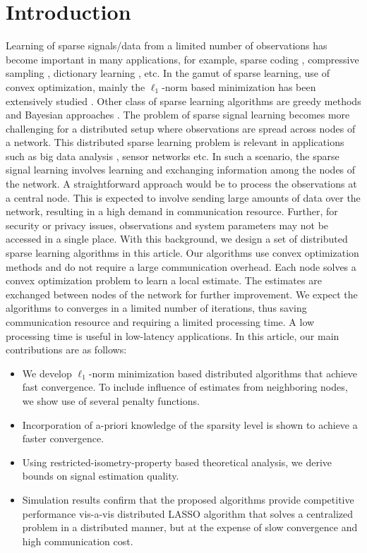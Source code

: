 \documentclass[journal]{IEEEtran}
\begin{document}
\section{Introduction}
Learning of sparse signals/data from a limited number of observations has become important in many applications, for example, sparse coding \cite{Elad_book_2010, Rubinstein_Elad_Dictionary_ProcIEEE_2010}, compressive sampling \cite{Donoho_2006_Compressed_sensing, CS_introduction_Candes_Wakin_2008}, dictionary learning \cite{Kreutz_Delgado_2003, Liang_distributed_DL_in_sensor_networks_2014}, etc. In the gamut of sparse learning, use of convex optimization, mainly the $\ell_1$-norm based minimization has been extensively studied \cite{Candes_Tao_universal_encoding_strategies_2006}. Other class of sparse learning algorithms are greedy methods and Bayesian approaches \cite{Chen_decentralized_bayesian_DCS_TWC_2016}. The problem of sparse signal learning becomes more challenging for a distributed setup where observations are spread across nodes of a network. This distributed sparse learning problem is relevant in applications such as big data analysis \cite{Giannakis_Big_Data_Analytics_SPMagazine_2014}, sensor networks \cite{Varshaney_OMP_joint_sparsity_pattern_recovery_TSP_2014, Varshaney_wireless_CS_distributed_sparse_TSIPN_2015} etc. In such a scenario, the sparse signal learning involves learning and exchanging information among the nodes of the network. A straightforward approach would be to process the observations at a central node. This is expected to involve sending large amounts of data over the network, resulting in a high demand in communication resource. Further, for security or privacy issues, observations and system parameters may not be accessed in a single place. With this background, we design a set of distributed sparse learning algorithms in this article. Our algorithms use convex optimization methods and do not require a large communication overhead. Each node solves a convex optimization problem to learn a local estimate. The estimates are exchanged between nodes of the network for further improvement. We expect the algorithms to converges in a limited number of iterations, thus saving communication resource and requiring a limited processing time. A low processing time is useful in low-latency applications. In this article, our main contributions are as follows:
\begin{itemize}
\item We develop $\ell_1$-norm minimization based distributed algorithms that achieve fast convergence. To include influence of estimates from neighboring nodes, we show use of several penalty functions. 
\item Incorporation of a-priori knowledge of the sparsity level is shown to achieve a faster convergence.
\item Using restricted-isometry-property based theoretical analysis, we derive bounds on signal estimation quality.
\item Simulation results confirm that the proposed algorithms provide competitive performance vis-a-vis distributed LASSO algorithm that solves a centralized problem in a distributed manner, but at the expense of slow convergence and high communication cost.
\end{itemize}
\end{document}
